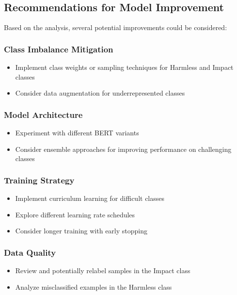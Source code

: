         
    \subsection{Recommendations for Model Improvement}

        Based on the analysis, several potential improvements could be considered:

        \subsubsection{Class Imbalance Mitigation}
        
            \begin{itemize}
                \item Implement class weights or sampling techniques for Harmless and Impact classes
                \item Consider data augmentation for underrepresented classes
            \end{itemize}

        \subsubsection{Model Architecture}
        
            \begin{itemize}
                \item Experiment with different BERT variants
                \item Consider ensemble approaches for improving performance on challenging classes
            \end{itemize}

        \subsubsection{Training Strategy}
        
            \begin{itemize}
                \item Implement curriculum learning for difficult classes
                \item Explore different learning rate schedules
                \item Consider longer training with early stopping
            \end{itemize}

        \subsubsection{Data Quality}
        
            \begin{itemize}
                \item Review and potentially relabel samples in the Impact class
                \item Analyze misclassified examples in the Harmless class
            \end{itemize}
    
